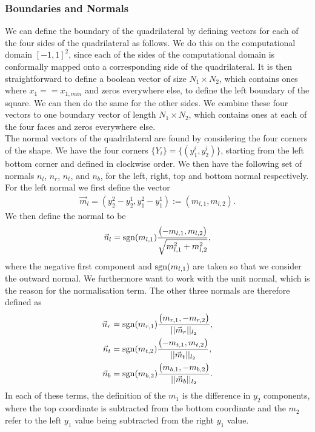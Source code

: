 \subsubsection{Boundaries and Normals}
We can define the boundary of the quadrilateral by defining vectors for each of the four sides of the quadrilateral as follows. We do this on the computational domain $[-1,1]^2$, since each of the sides of the computational domain is conformally mapped onto a corresponding side of the quadrilateral. It is then straightforward to define a boolean vector of size $N_1 \times N_2$, which contains ones where $x_1 == x_{1,min}$ and zeros everywhere else, to define the left boundary of the square. We can then do the same for the other sides. We combine these four vectors to one boundary vector of length $N_1 \times N_2$, which contains ones at each of the four faces and zeros everywhere else. 
\\
The normal vectors of the quadrilateral are found by considering the four corners of the shape. We have the four corners $\{Y_i\} = \{(y_1^i,y_2^i)\}$, starting from the left bottom corner and defined in clockwise order. We then have the following set of normals $n_l$, $n_r$, $n_t$, and $n_b$, for the left, right, top and bottom normal respectively.
For the left normal we first define the vector
\begin{align*}
     \vec m_l = \left(y_2^2 - y_2^1, y_1^2 - y_1^1 \right) := \left(m_{l,1},m_{l,2} \right). 
\end{align*}
We then define the normal to be
\begin{align*}
	\vec n_l =  \operatorname{sgn} (m_{l,1})\frac{\left(-m_{l,1},m_{l,2} \right)}{\sqrt{m_{l,1}^2+m_{l,2}^2 }},
\end{align*}
where the negative first component and $\operatorname{sgn} (m_{l,1})$ are taken so that we 
consider the outward normal. We furthermore want to work with the unit normal, which is the reason for the normalisation term. The other three normals are therefore defined as
\begin{align*}
	\vec n_r &=  \operatorname{sgn} (m_{r,1})\frac{\left(m_{r,1}, - m_{r,2} \right)}{||\vec m_{r} ||_{l_2}},\\
	\vec n_t &=  \operatorname{sgn} (m_{t,2})\frac{\left(-m_{t,1},m_{t,2} \right)}{||\vec m_{t} ||_{l_2}},\\
	\vec n_b &=  \operatorname{sgn} (m_{b,2})\frac{\left(m_{b,1},-m_{b,2} \right)}{||\vec m_{b} ||_{l_2}}.
\end{align*}
In each of these terms, the definition of the $m_1$ is the difference in $y_2$ components, where the top coordinate is subtracted from the bottom coordinate and the $m_2$ refer to the left $y_1$ value being subtracted from the right $y_1$ value.
